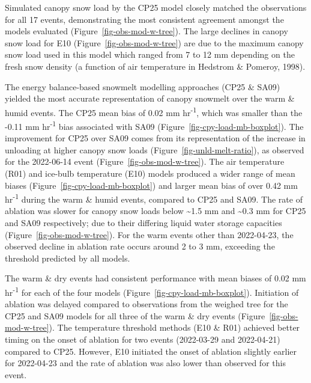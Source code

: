 \documentclass[
  letterpaper,
]{tex/uofsthesis-cs}
\begin{document}
Simulated canopy snow load by the CP25 model closely matched the
observations for all 17 events, demonstrating the most consistent
agreement amongst the models evaluated
(Figure~\ref{fig-obs-mod-w-tree}). The large declines in canopy snow
load for E10 (Figure~\ref{fig-obs-mod-w-tree}) are due to the maximum
canopy snow load used in this model which ranged from 7 to 12 mm
depending on the fresh snow density (a function of air temperature in
Hedstrom \& Pomeroy, 1998).

The energy balance-based snowmelt modelling approaches (CP25 \& SA09)
yielded the most accurate representation of canopy snowmelt over the
warm \& humid events. The CP25 mean bias of 0.02 mm
hr\textsuperscript{-1}, which was smaller than the -0.11 mm
hr\textsuperscript{-1} bias associated with SA09
(Figure~\ref{fig-cpy-load-mb-boxplot}). The improvement for CP25 over
SA09 comes from its representation of the increase in unloading at
higher canopy snow loads (Figure~\ref{fig-unld-melt-ratio}), as observed
for the 2022-06-14 event (Figure~\ref{fig-obs-mod-w-tree}). The air
temperature (R01) and ice-bulb temperature (E10) models produced a wider
range of mean biases (Figure~\ref{fig-cpy-load-mb-boxplot}) and larger
mean bias of over 0.42 mm hr\textsuperscript{-1} during the warm \&
humid events, compared to CP25 and SA09. The rate of ablation was slower
for canopy snow loads below \textasciitilde1.5 mm and \textasciitilde0.3
mm for CP25 and SA09 respectively; due to their differing liquid water
storage capacities (Figure~\ref{fig-obs-mod-w-tree}). For the warm
events other than 2022-04-23, the observed decline in ablation rate
occurs around 2 to 3 mm, exceeding the threshold predicted by all
models.

The warm \& dry events had consistent performance with mean biases of
0.02 mm hr\textsuperscript{-1} for each of the four models
(Figure~\ref{fig-cpy-load-mb-boxplot}). Initiation of ablation was
delayed compared to observations from the weighed tree for the CP25 and
SA09 models for all three of the warm \& dry events
(Figure~\ref{fig-obs-mod-w-tree}). The temperature threshold methods
(E10 \& R01) achieved better timing on the onset of ablation for two
events (2022-03-29 and 2022-04-21) compared to CP25. However, E10
initiated the onset of ablation slightly earlier for 2022-04-23 and the
rate of ablation was also lower than observed for this event.
\end{document}
